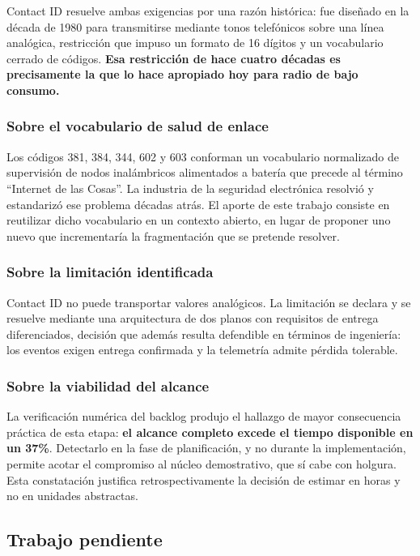 Contact ID resuelve ambas exigencias por una razón histórica: fue diseñado en la década de 1980 para
transmitirse mediante tonos telefónicos sobre una línea analógica, restricción que impuso un formato de
16 dígitos y un vocabulario cerrado de códigos. \textbf{Esa restricción de hace cuatro décadas es
precisamente la que lo hace apropiado hoy para radio de bajo consumo.}

\subsubsection{Sobre el vocabulario de salud de enlace}

Los códigos 381, 384, 344, 602 y 603 conforman un vocabulario normalizado de supervisión de nodos
inalámbricos alimentados a batería que precede al término \enquote{Internet de las Cosas}. La industria
de la seguridad electrónica resolvió y estandarizó ese problema décadas atrás. El aporte de este trabajo
consiste en reutilizar dicho vocabulario en un contexto abierto, en lugar de proponer uno nuevo que
incrementaría la fragmentación que se pretende resolver.

\subsubsection{Sobre la limitación identificada}

Contact ID no puede transportar valores analógicos. La limitación se declara y se resuelve mediante una
arquitectura de dos planos con requisitos de entrega diferenciados, decisión que además resulta
defendible en términos de ingeniería: los eventos exigen entrega confirmada y la telemetría admite
pérdida tolerable.

\subsubsection{Sobre la viabilidad del alcance}

La verificación numérica del backlog produjo el hallazgo de mayor consecuencia práctica de esta etapa:
\textbf{el alcance completo excede el tiempo disponible en un 37\%}. Detectarlo en la fase de
planificación, y no durante la implementación, permite acotar el compromiso al núcleo demostrativo, que
sí cabe con holgura. Esta constatación justifica retrospectivamente la decisión de estimar en horas y no
en unidades abstractas.

\subsection{Trabajo pendiente}

